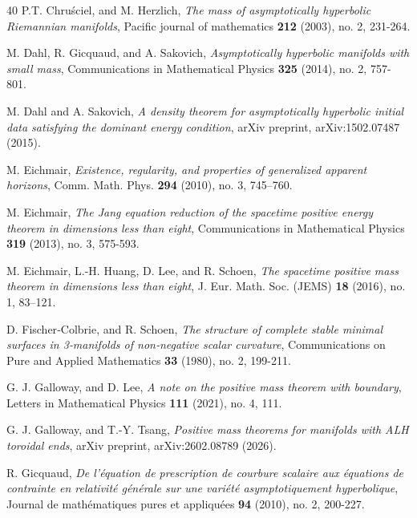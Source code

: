 \documentclass[11pt]{amsart}
\theoremstyle{remark}
\numberwithin{equation}{section}
\begin{document}
{{\begin{thebibliography}{40}
P.T. Chruściel, and M. Herzlich, {\em The mass of asymptotically hyperbolic Riemannian manifolds}, Pacific journal of mathematics \textbf{212} (2003), no. 2, 231-264.

 M. Dahl, R. Gicquaud, and A. Sakovich, {\em Asymptotically hyperbolic manifolds with small mass}, Communications in Mathematical Physics \textbf{325} (2014), no. 2, 757-801.

 M. Dahl and A. Sakovich, {\em A density theorem for asymptotically hyperbolic initial data satisfying the dominant energy condition}, arXiv preprint, arXiv:1502.07487 (2015). 

 M. Eichmair, {\em Existence, regularity, and properties of generalized apparent horizons}, Comm. Math. Phys. \textbf{294} (2010), no. 3, 745–760. 

M. Eichmair, {\em The Jang equation reduction of the spacetime positive energy theorem in dimensions less than eight}, Communications in Mathematical Physics \textbf{319} (2013), no. 3, 575-593.


M. Eichmair, L.-H. Huang, D. Lee, and R. Schoen, {\em The spacetime positive mass theorem in dimensions less than eight}, J. Eur. Math. Soc. (JEMS) \textbf{18} (2016), no. 1, 83–121.

D. Fischer‐Colbrie, and R. Schoen, {\em The structure of complete stable minimal surfaces in 3‐manifolds of non‐negative scalar curvature}, Communications on Pure and Applied Mathematics \textbf{33} (1980), no. 2, 199-211. 

G. J. Galloway, and D. Lee, {\em A note on the positive mass theorem with boundary},  Letters in Mathematical Physics \textbf{111} (2021), no. 4, 111.


G. J. Galloway, and T.-Y. Tsang, {\em Positive mass theorems for manifolds with ALH toroidal ends}, arXiv preprint, arXiv:2602.08789 (2026).  

R. Gicquaud, {\em De l'équation de prescription de courbure scalaire aux équations de contrainte en relativité générale sur une variété asymptotiquement hyperbolique}, Journal de mathématiques pures et appliquées \textbf{94} (2010), no. 2, 200-227.


\end{thebibliography}}}
\end{document}
